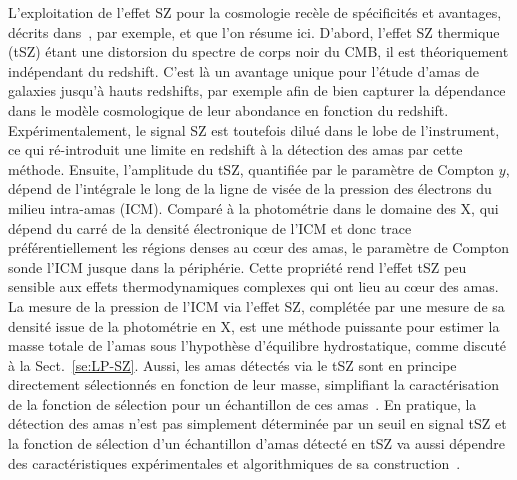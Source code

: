 L'exploitation de l'effet SZ pour la cosmologie recèle de spécificités
et avantages, décrits dans~\citet{Carlstrom2002}, par exemple, et que
l'on résume ici. D'abord, l'effet SZ thermique (tSZ)
étant une distorsion du spectre de corps noir du CMB, il est
théoriquement indépendant du redshift. C'est là un avantage unique
pour l'étude d'amas de galaxies jusqu'à hauts redshifts, par exemple
afin de bien capturer la dépendance dans le modèle cosmologique de
leur abondance en fonction du redshift. Expérimentalement, le signal SZ est toutefois dilué
dans le lobe de l'instrument, ce qui ré-introduit une limite en
redshift à la détection des amas par cette méthode. Ensuite,
l'amplitude du tSZ, quantifiée par le paramètre de Compton $y$, dépend
de l'intégrale le long de la ligne de visée de la pression des
électrons du milieu intra-amas (ICM). %
Comparé à la photométrie dans le domaine des X, qui dépend du carré de
la densité électronique de l'ICM et donc trace préférentiellement les régions
denses au cœur des amas, le paramètre de Compton sonde l'ICM jusque
dans la périphérie. Cette propriété rend l'effet tSZ peu sensible aux
effets thermodynamiques complexes qui ont lieu au cœur des
amas. La mesure de la pression de l'ICM via l'effet SZ, complétée par
une mesure de sa densité issue de la photométrie en X, est une méthode
puissante pour estimer la masse totale de l'amas sous l'hypothèse
d'équilibre hydrostatique, comme discuté à la Sect.~\ref{se:LP-SZ}.
Aussi, les amas détectés via le tSZ sont en principe directement
sélectionnés en fonction de leur masse, simplifiant la caractérisation
de la fonction de sélection pour un échantillon de ces
amas~\citep{Holder2000}. En pratique, la détection des amas n'est pas
simplement déterminée par un seuil en signal tSZ et la fonction de
sélection d'un échantillon d'amas détecté en tSZ va aussi dépendre des
caractéristiques expérimentales et algorithmiques de sa
construction~\citep{Melin2005}.

